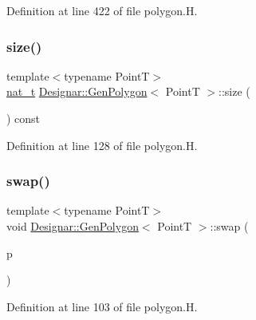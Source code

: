 Definition at line 422 of file polygon.\+H.

\mbox{\label{class_designar_1_1_gen_polygon_a7e39723b98f9fd7dabe41de58cf29575}} 
\subsubsection{\texorpdfstring{size()}{size()}}
{\footnotesize\ttfamily template$<$typename PointT$>$ \\
\hyperlink{namespace_designar_aa72662848b9f4815e7bf31a7cf3e33d1}{nat\+\_\+t} \hyperlink{class_designar_1_1_gen_polygon}{Designar\+::\+Gen\+Polygon}$<$ PointT $>$\+::size (\begin{DoxyParamCaption}{ }\end{DoxyParamCaption}) const\hspace{0.3cm}{\ttfamily [inline]}}



Definition at line 128 of file polygon.\+H.

\mbox{\label{class_designar_1_1_gen_polygon_ac3c88479623a86d9f49c24676f837c0d}} 
\subsubsection{\texorpdfstring{swap()}{swap()}}
{\footnotesize\ttfamily template$<$typename PointT$>$ \\
void \hyperlink{class_designar_1_1_gen_polygon}{Designar\+::\+Gen\+Polygon}$<$ PointT $>$\+::swap (\begin{DoxyParamCaption}\item[{\hyperlink{class_designar_1_1_gen_polygon}{Gen\+Polygon}$<$ PointT $>$ \&}]{p }\end{DoxyParamCaption})\hspace{0.3cm}{\ttfamily [inline]}}



Definition at line 103 of file polygon.\+H.

\mbox{\label{class_designar_1_1_gen_polygon_a46604941ab9b33349086f7ca4b222869}} 
